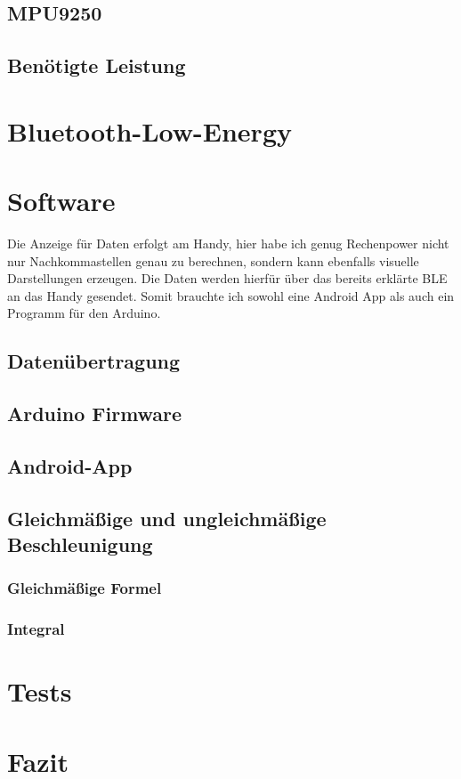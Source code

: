 \documentclass[12pt,titlepage]{scrreprt}
\begin{document}
\section{MPU9250}

\section{Benötigte Leistung}


\chapter{Bluetooth-Low-Energy}




\chapter{Software}
Die Anzeige für Daten erfolgt am Handy, hier habe ich genug Rechenpower
nicht nur Nachkommastellen genau zu berechnen, sondern kann ebenfalls 
visuelle Darstellungen erzeugen. Die Daten werden hierfür über das bereits
erklärte BLE an das Handy gesendet.
Somit brauchte ich sowohl eine Android App als auch ein Programm für den Arduino.
\section{Datenübertragung}

\section{Arduino Firmware}

\section{Android-App}

\section{Gleichmäßige und ungleichmäßige Beschleunigung}

\subsection{Gleichmäßige Formel}

\subsection{Integral}

\chapter{Tests}


%
%

\chapter{Fazit}




\end{document}
